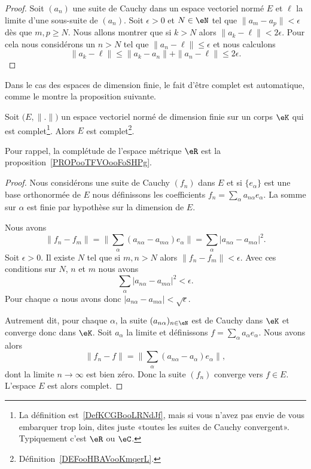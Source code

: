 \begin{proof}
	Soit \( (a_n)\) une suite de Cauchy dans un espace vectoriel normé \( E\) et \( \ell\) la limite d'une sous-suite de \( (a_n)\). Soit \( \epsilon>0\) et \( N\in \eN\) tel que \( \| a_m-a_p \|<\epsilon\) dès que \( m,p\geq N\). Nous allons montrer que si \( k>N\) alors \( \| a_k-\ell \|<2\epsilon\). Pour cela nous considérons un \( n>N\) tel que \( \| a_n-\ell \|\leq \epsilon\) et nous calculons
	\begin{equation}
		\| a_k-\ell \|\leq \| a_k-a_n \|+\| a_n-\ell \|\leq 2\epsilon.
	\end{equation}
\end{proof}

Dans le cas des espaces de dimension finie, le fait d'être complet est automatique, comme le montre la proposition suivante.
\begin{proposition}     \label{PROPooGJDTooXOoYfw}
	Soit \( \big( E,\| . \| \big)\) un espace vectoriel normé de dimension finie sur un corps \( \eK\) qui est complet\footnote{La définition est~\ref{DefKCGBooLRNdJf}, mais si vous n'avez pas envie de vous embarquer trop loin, dites juste «toutes les suites de Cauchy convergent». Typiquement c'est \( \eR\) ou \( \eC\).}. Alors \( E\) est complet\footnote{Définition~\ref{DEFooHBAVooKmqerL}.}.
\end{proposition}
Pour rappel, la complétude de l'espace métrique \( \eR\) est la proposition~\ref{PROPooTFVOooFoSHPg}.

\begin{proof}
	Nous considérons une suite de Cauchy \( (f_n)\) dans \( E\) et si \( \{ e_{\alpha} \} \) est une base orthonormée de \( E\) nous définissons les coefficients \( f_n=\sum_{\alpha}a_{n\alpha}e_{\alpha} \). La somme sur \( \alpha\) est finie par hypothèse sur la dimension de \( E\).

	Nous avons
	\begin{equation}
		\| f_n-f_m \|=\| \sum_{\alpha}(a_{n\alpha}-a_{m\alpha})e_{\alpha} \|=\sum_{\alpha}| a_{n\alpha}-a_{m\alpha} |^2.
	\end{equation}
	Soit \( \epsilon>0\). Il existe \( N\) tel que si \( m,n>N\) alors \( \| f_n-f_m \|<\epsilon\). Avec ces conditions sur \( N\), \( n\) et \( m\) nous avons
	\begin{equation}
		\sum_{\alpha}| a_{n\alpha}-a_{m\alpha} |^2<\epsilon.
	\end{equation}
	Pour chaque \( \alpha\) nous avons donc \( | a_{n\alpha}-a_{m\alpha} |<\sqrt{ \epsilon }\).

	Autrement dit, pour chaque \( \alpha\), la suite \( (a_{n\alpha})_{n\in \eN}\) est de Cauchy dans \( \eK\) et converge donc dans \( \eK\). Soit \( a_{\alpha}\) la limite et définissons \( f=\sum_{\alpha}a_{\alpha}e_{\alpha}\). Nous avons alors
	\begin{equation}
		\| f_n-f \|=\| \sum_{\alpha}(a_{n\alpha}-a_{\alpha})e_{\alpha} \|,
	\end{equation}
	dont la limite \( n\to \infty\) est bien zéro. Donc la suite \( (f_n)\) converge vers \( f\in E\). L'espace \( E\) est alors complet.
\end{proof}


